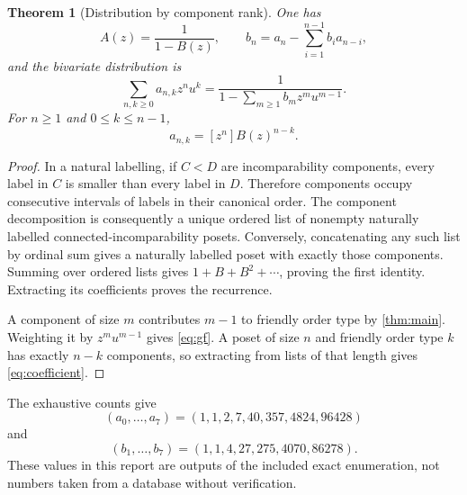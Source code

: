 \documentclass[11pt,letterpaper]{article}
\newtheorem{theorem}{Theorem}[section]
\theoremstyle{definition}
\theoremstyle{remark}
\begin{document}
\begin{theorem}[Distribution by component rank]\label{thm:gf}
One has
\begin{equation}\label{eq:gf-univariate}
 A(z)=\frac{1}{1-B(z)},\qquad
 b_n=a_n-\sum_{i=1}^{n-1}b_i a_{n-i},
\end{equation}
and the bivariate distribution is
\begin{equation}\label{eq:gf}
 \boxed{\sum_{n,k\geq0}a_{n,k}z^n u^k
 =\frac{1}{1-\sum_{m\geq1}b_mz^m u^{m-1}}.}
\end{equation}
For $n\geq1$ and $0\leq k\leq n-1$,
\begin{equation}\label{eq:coefficient}
 a_{n,k}=[z^n]B(z)^{n-k}.
\end{equation}
\end{theorem}
\begin{proof}
In a natural labelling, if $C<D$ are incomparability components, every
label in $C$ is smaller than every label in $D$. Therefore components
occupy consecutive intervals of labels in their canonical order. The
component decomposition is consequently a unique ordered list of nonempty
naturally labelled connected-incomparability posets. Conversely, concatenating
any such list by ordinal sum gives a naturally labelled poset with exactly
those components. Summing over ordered lists gives
$1+B+B^2+\cdots$, proving the first identity. Extracting its coefficients
proves the recurrence.

A component of size $m$ contributes $m-1$ to friendly order type by
\cref{thm:main}. Weighting it by $z^m u^{m-1}$ gives \eqref{eq:gf}.
A poset of size $n$ and friendly order type $k$ has exactly $n-k$ components,
so extracting from lists of that length gives \eqref{eq:coefficient}.
\end{proof}

The exhaustive counts give
\[
 (a_0,\ldots,a_7)=(1,1,2,7,40,357,4824,96428)
\]
and
\[
 (b_1,\ldots,b_7)=(1,1,4,27,275,4070,86278).
\]
These values in this report are outputs of the included exact enumeration,
not numbers taken from a database without verification.
\end{document}
